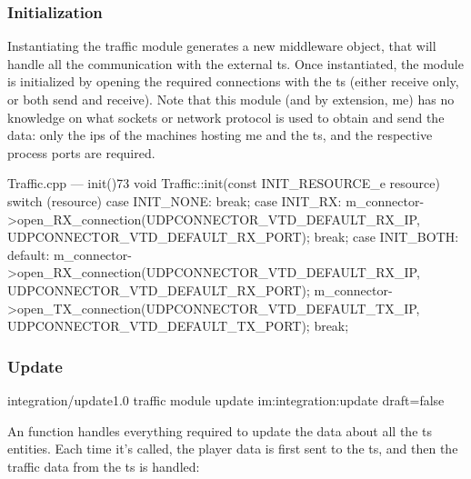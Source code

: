 \subsubsection{Initialization}

Instantiating the traffic module generates a new \gls{middleware}  object, that will handle all the communication with the external \gls{ts}. Once instantiated, the module is initialized by opening the required connections with the \gls{ts} (either receive only, or both send and receive). Note that this module (and by extension, \gls{me}) has no knowledge on what sockets or network protocol is used to obtain and send the data: only the \glspl{ip} of the machines hosting \gls{me} and the \gls{ts}, and the respective process ports are required.

\begin{codelist}{Traffic.cpp --- init()}{73}
void Traffic::init(const INIT_RESOURCE_e resource) {
    switch (resource) {
        case INIT_NONE:
            break;
        case INIT_RX:
            m_connector->open_RX_connection(UDPCONNECTOR_VTD_DEFAULT_RX_IP, UDPCONNECTOR_VTD_DEFAULT_RX_PORT);
            break;
        case INIT_BOTH:
        default:
            m_connector->open_RX_connection(UDPCONNECTOR_VTD_DEFAULT_RX_IP, UDPCONNECTOR_VTD_DEFAULT_RX_PORT);
            m_connector->open_TX_connection(UDPCONNECTOR_VTD_DEFAULT_TX_IP, UDPCONNECTOR_VTD_DEFAULT_TX_PORT);
            break;
    }
}
\end{codelist}

\subsubsection{Update}

\begin{image}
	{integration/update}{1.0}
	{traffic module update}
	{im:integration:update}
	{draft=false}
\end{image}

An  function handles everything required to update the data about all the \gls{ts} entities. Each time it's called, the player data is first sent to the \gls{ts}, and then the traffic data from the \gls{ts} is handled:

